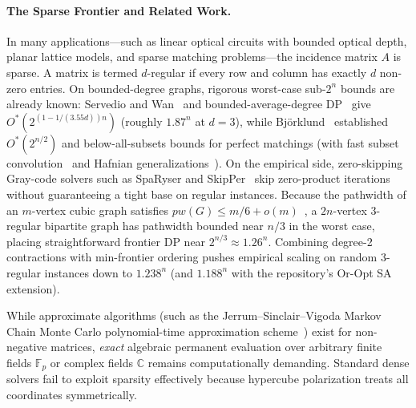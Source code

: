 \documentclass[11pt,a4paper]{article}
\theoremstyle{definition}
\newcommand{\F}{\mathbb{F}}
\begin{document}
\paragraph{The Sparse Frontier and Related Work.}
In many applications---such as linear optical circuits with bounded optical depth, planar lattice models, and sparse matching problems---the incidence matrix $A$ is sparse. A matrix is termed $d$-regular if every row and column has exactly $d$ non-zero entries. On bounded-degree graphs, rigorous worst-case sub-$2^n$ bounds are already known: Servedio and Wan~\cite{servediowan2005} and bounded-average-degree DP~\cite{izumiwadayama2012} give $O^*(2^{(1 - 1/(3.55d))n})$ (roughly $1.87^n$ at $d = 3$), while Bj\"orklund~\cite{bjorklund2012,bjorklund2016} established $O^*(2^{n/2})$ and below-all-subsets bounds for perfect matchings (with fast subset convolution~\cite{bhkk2007} and Hafnian generalizations~\cite{bgq2019}). On the empirical side, zero-skipping Gray-code solvers such as SpaRyser and SkipPer~\cite{kaya2019} skip zero-product iterations without guaranteeing a tight base on regular instances. Because the pathwidth of an $m$-vertex cubic graph satisfies $pw(G) \le m/6 + o(m)$~\cite{fominhoie2006}, a $2n$-vertex 3-regular bipartite graph has pathwidth bounded near $n/3$ in the worst case, placing straightforward frontier DP near $2^{n/3} \approx 1.26^n$. Combining degree-2 contractions with min-frontier ordering pushes empirical scaling on random 3-regular instances down to $1.238^n$ (and $1.188^n$ with the repository's Or-Opt SA extension).

While approximate algorithms (such as the Jerrum--Sinclair--Vigoda Markov Chain Monte Carlo polynomial-time approximation scheme~\cite{jsv2004}) exist for non-negative matrices, \emph{exact} algebraic permanent evaluation over arbitrary finite fields $\F_p$ or complex fields $\mathbb{C}$ remains computationally demanding. Standard dense solvers fail to exploit sparsity effectively because hypercube polarization treats all coordinates symmetrically.
\end{document}
